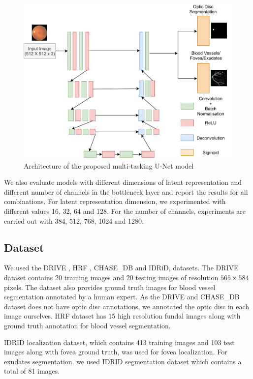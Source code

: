 \documentclass{article}
\begin{document}
\begin{figure}[!ht]
\centering
\includegraphics[width=0.9\linewidth]{images/UnetArch.pdf}
\caption{Architecture of the proposed multi-tasking U-Net model}
\label{unet_combined}
\end{figure}

We also evaluate models with different dimensions of latent representation and different number of channels  in the bottleneck layer and report the results for all combinations. For latent representation dimension, we experimented with different values 16, 32, 64 and 128. For the number of channels, experiments are carried out with 384, 512, 768, 1024 and 1280.

\subsection{Dataset}
We used the DRIVE \cite{drive}, HRF \cite{budai2013robust}, CHASE\_DB\cite{chase_db} and IDRiD\cite{idrid},  datasets. The DRIVE dataset contains 20 training images and 20 testing images of resolution $565 \times 584$ pixels. The dataset also provides ground truth images for blood vessel segmentation annotated by a human expert. As the DRIVE and CHASE\_DB dataset does not have optic disc annotations, we annotated the optic disc in each image ourselves. HRF dataset has 15 high resolution fundal images along with ground truth annotation for blood vessel segmentation.

IDRID \cite{h25w98-18} localization dataset, which contains  413 training images and 103 test images along with fovea ground truth, was used for fovea localization. For exudates segmentation, we used IDRID \cite{h25w98-18} segmentation dataset which contains a total of 81 images.
\end{document}
